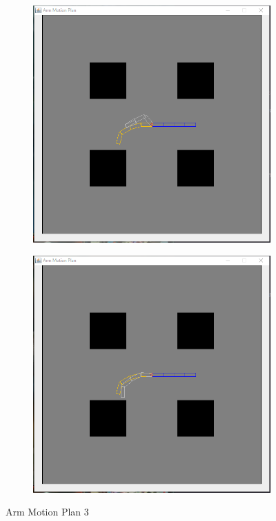 \documentclass{article}
\begin{document}
\begin{figure}[!htb]
\centering
\begin{subfigure}{0.4\textwidth}
  \includegraphics[width=\linewidth]{arm_5}
\end{subfigure}
\begin{subfigure}{0.4\textwidth}
  \includegraphics[width=\linewidth]{arm_6}
\end{subfigure}
\caption{Arm Motion Plan 3}
\end{figure}
\end{document}
